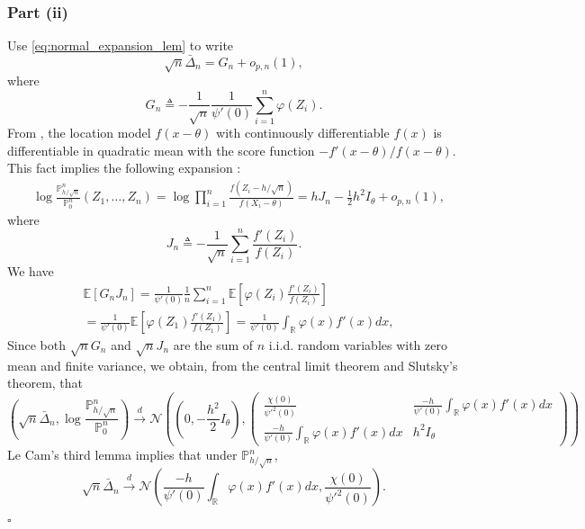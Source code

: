 \documentclass[letterpaper, 11pt]{IEEEtran}      %
\newcommand{\ex}[1]{\ensuremath{\mathbb{E}\left[ #1\right]}}
\newcommand{\Prob}{\mathbb{P} }
\newcommand*{\QEDA}{\hfill\ensuremath{\square}}
\newcommand{\Ncal}{\mathcal{N}}
\begin{document}
{\subsubsection*{Part (ii)}
Use \eqref{eq:normal_expansion_lem} to write
\[
\sqrt{n} \bar{\Delta}_n = G_n + o_{p,n}(1),
\]
where
\[
G_n \triangleq -\frac{1}{\sqrt{n}} \frac{1}{\psi'(0)} \sum_{i=1}^{n} \varphi(Z_i). 
\]
From \cite[Exm. 7.8]{van2000asymptotic}, the location model $f(x-\theta)$ with continuously differentiable $f(x)$ is differentiable in quadratic mean with the score function $-f'(x-\theta)/f(x-\theta)$. This fact implies the following expansion \cite[Thm. 7.2]{van2000asymptotic}:
\begin{align}
\label{eq:PJ_LAN}
& \log \frac{\Prob^n_{h/\sqrt{n}}}{\Prob^n_0} (Z_1,\ldots,Z_n) =  \log \prod_{i=1}^{n} \frac{f(Z_i-h/\sqrt{n})}  {f(X_i-\theta)} = h J_n - \frac{1}{2}h^2 I_{\theta} + o_{p,n}(1),
\end{align}
where 
\[
J_n \triangleq -\frac{1}{\sqrt{n}} \sum_{i=1}^n \frac{f'(Z_i)}{f(Z_i)} .
\]
We have
\begin{align*}
& \ex{ G_n J_n} = \frac{1}{\psi'(0)}\frac{1}{n} \sum_{i=1}^n \ex{ \varphi(Z_i) \frac{f'(Z_i)}{f(Z_i)} }  \\
& = \frac{1}{ \psi'(0)} \ex{ \varphi(Z_1) \frac{f'(Z_1)}{f(Z_1)}} =  \frac{1}{ \psi'(0)} \int_{\mathbb R} \varphi(x) f'(x) dx , 
\end{align*}
Since both $\sqrt{n}G_n$ and $\sqrt{n}J_n$ are the sum of $n$ i.i.d. random variables with zero mean and finite variance, we obtain, from the central limit theorem and Slutsky's theorem, that
\[
\left(\sqrt{n} \bar{\Delta}_n, \log \frac{\Prob^n_{h/\sqrt{n}}}{\Prob^n_0} \right) \overset{d}{\to} \Ncal \left( \left(0,-\frac{h^2}{2} I_\theta \right),  \begin{pmatrix}
\frac{\chi(0)}{\psi'^2(0)} & \frac{-h}{ \psi'(0)} \int_{\mathbb R} \varphi(x) f'(x) dx \\
\frac{-h}{ \psi'(0)} \int_{\mathbb R} \varphi(x) f'(x) dx & h^2 I_\theta 
\end{pmatrix}  \right)
\]
Le Cam's third lemma \cite[Exm. 6.7]{van2000asymptotic} implies that under $\Prob^n_{h/\sqrt{n}}$, 
\[
\sqrt{n}\bar{\Delta}_n \overset{d}{\to} \Ncal\left(\frac{-h}{ \psi'(0)} \int_{\mathbb R} \varphi(x) f'(x) dx,  \frac{\chi(0)}{\psi'^2(0)} \right).
\]

\QEDA
}
\end{document}
